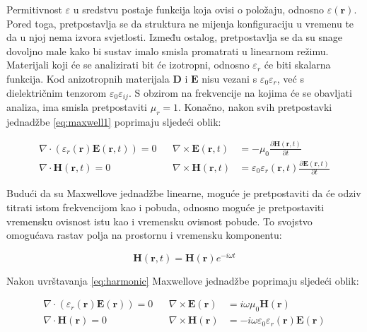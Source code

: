 \documentclass[utf8, seminar, numeric]{fer}
\begin{document}
Permitivnost $\varepsilon$ u sredstvu postaje funkcija koja ovisi o položaju,
odnosno $\varepsilon(\mathbf{r})$. Pored toga, pretpostavlja se da struktura ne
mijenja konfiguraciju u vremenu te da u njoj nema izvora svjetlosti. Između
ostalog, pretpostavlja se da su snage dovoljno male kako bi sustav imalo smisla
promatrati u linearnom režimu. Materijali koji će se analizirati bit će
izotropni, odnosno $\varepsilon_r$ će biti skalarna funkcija. Kod
anizotropnih materijala $\mathbf{D}$ i $\mathbf{E}$ nisu vezani s
$\varepsilon_0 \varepsilon_r$, već s dielektričnim tenzorom
$\varepsilon_0 \varepsilon_{ij}$. S obzirom na frekvencije na kojima će se
obavljati analiza, ima smisla pretpostaviti $\mu_r = 1$. Konačno, nakon svih
pretpostavki jednadžbe \ref{eq:maxwell1} poprimaju sljedeći oblik:

\begin{align} \label{eq:maxwell2}
	\nabla \cdot (\varepsilon_r(\mathbf{r}) \mathbf{E}(\mathbf{r}, t)) = 0 &&
	\nabla \times \mathbf{E}(\mathbf{r}, t) &=
		- \mu_0
		\frac{\partial \mathbf{H}(\mathbf{r}, t)}{\partial t}  \nonumber \\
	\nabla \cdot \mathbf{H}(\mathbf{r}, t) = 0 &&
	\nabla \times \mathbf{H}(\mathbf{r}, t) &=
		\varepsilon_0 \varepsilon_r(\mathbf{r}, t)
		\frac{\partial \mathbf{E}(\mathbf{r}, t)}{\partial t}
\end{align}

Budući da su Maxwellove jednadžbe linearne\cite{time-harmonic_maxwell},
moguće je pretpostaviti da će odziv titrati istom frekvencijom kao i pobuda,
odnosno moguće je pretpostaviti vremensku ovisnost istu kao i vremensku ovisnost
pobude. To svojstvo omogućava rastav polja na prostornu i vremensku komponentu:

\begin{equation} \label{eq:harmonic}
	\mathbf{H}(\mathbf{r}, t) = \mathbf{H}(\mathbf{r}) e^{-i \omega t}
\end{equation}

Nakon uvrštavanja \ref{eq:harmonic} Maxwellove jednadžbe poprimaju sljedeći
oblik:

\begin{align} \label{eq:maxwell3}
	\nabla \cdot (\varepsilon_r(\mathbf{r}) \mathbf{E}(\mathbf{r})) = 0 &&
	\nabla \times \mathbf{E}(\mathbf{r}) &=
		i \omega \mu_0 \mathbf{H}(\mathbf{r})  \nonumber \\
	\nabla \cdot \mathbf{H}(\mathbf{r}) = 0 &&
	\nabla \times \mathbf{H}(\mathbf{r}) &=
		- i \omega \varepsilon_0 \varepsilon_r(\mathbf{r})\mathbf{E}(\mathbf{r})
\end{align}
\end{document}
